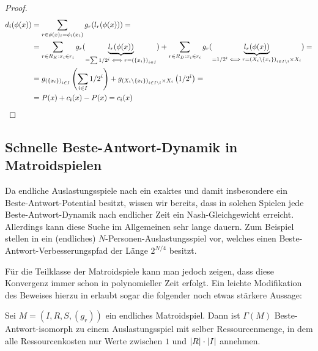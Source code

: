 \begin{proof}
	\begin{align*}
	d_{\hat{\imath}}(\phi(x)) 	&=\sum_{r \in \phi(x)_{\hat{\imath}} = \phi_{\hat{\imath}}(x_{\hat{\imath}})} g_r(l_r(\phi(x))) = \\
	&=\sum_{r \in R_K: x_{\hat{\imath}} \in r_{\hat{\imath}}} g_r(\underbrace{l_r(\phi(x))}_{= \sum 1/2^i \iff r = \left(\{x_i\}\right)_{i \in I}}) + \sum_{r \in R_D: x_{\hat{\imath}} \in r_i} g_r(\underbrace{l_r(\phi(x))}_{=1/2^{\hat{\imath}} \iff r = \left(X_i\setminus\{x_i\}\right)_{i \in I\setminus\hat{\imath}} \times X_{\hat{\imath}}}) = \\
	&=g_{\left(\{x_i\}\right)_{i \in I}}\left(\sum_{i \in I} 1/2^i\right) + g_{\left(X_i\setminus\{x_i\}\right)_{i \in I\setminus\hat{\imath}} \times X_{\hat{\imath}}}\left(1/2^{\hat{\imath}}\right) = \\
	&=P(x) + c_{\hat{\imath}}(x) - P(x) = c_{\hat{\imath}}(x) \qedhere									
	\end{align*}
\end{proof}

\subsection{Schnelle Beste-Antwort-Dynamik in Matroidspielen}

Da endliche Auslastungsspiele nach  ein exaktes und damit insbesondere ein Beste-Antwort-Potential besitzt, wissen wir bereits, dass in solchen Spielen jede Beste-Antwort-Dynamik nach endlicher Zeit ein Nash-Gleichgewicht erreicht. Allerdings kann diese Suche im Allgemeinen sehr lange dauern. Zum Beispiel stellen \citeauthor{BAPfadLaengeInAusl} in \cite[Theorem 3.1]{BAPfadLaengeInAusl} ein (endliches) $N$-Personen-Auslastungsspiel vor, welches einen Beste-Antwort-Verbesserungspfad der Länge $2^{N/4}$ besitzt.

Für die Teilklasse der Matroidspiele kann man jedoch zeigen, dass diese Konvergenz immer schon in polynomieller Zeit erfolgt. Ein leichte Modifikation des Beweises hierzu in \cite[Theorem 2.5]{BAPfadLaengeInAusl} erlaubt sogar die folgender noch etwas stärkere Aussage:

\begin{satz}\label{satz:BAPotentialFuerMatroidspiele}
	Sei $M = (I, R, S, (g_r))$ ein endliches Matroidspiel. Dann ist $\Gamma(M)$ Beste-Antwort-isomorph zu einem Auslastungsspiel mit selber Ressourcenmenge, in dem alle Ressourcenkosten nur Werte zwischen $1$ und $\left|R\right|\cdot\left|I\right|$ annehmen.
\end{satz}

